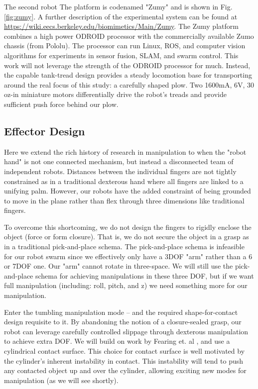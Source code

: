 \documentclass[runningheads,a4paper]{llncs}
\begin{document}
The second robot The platform is codenamed "Zumy" and is shown in Fig. \ref{fig:zumy}.
A further description of the experimental system can be found at \url{https://wiki.eecs.berkeley.edu/biomimetics/Main/Zumy}.
The Zumy platform combines a high power ODROID processor with the commercially available Zumo chassis (from Pololu).
The processor can run Linux, ROS, and computer vision algorithms for experiments in sensor fusion, SLAM, and swarm control.
This work will not leverage the strength of the ODROID processor for much.
Instead, the capable tank-tread design provides a steady locomotion base for transporting around the real focus of this study: a carefully shaped plow.
Two 1600mA, 6V, 30 oz-in miniature motors differentially drive the robot's treads and provide sufficient push force behind our plow.

\subsection{Effector Design}

Here we extend the rich history of research in manipulation to when the "robot hand" is not one connected mechanism, but instead a disconnected team of independent robots.
Distances between the individual fingers are not tightly constrained as in a traditional dexterous hand where all fingers are linked to a unifying palm.
However, our robots have the added constraint of being grounded to move in the plane rather than flex through three dimensions like traditional fingers.

To overcome this shortcoming, we do not design the fingers to rigidly enclose the object (force or form closure).
That is, we do not secure the object in a grasp as in a traditional pick-and-place schema.
The pick-and-place schema is infeasible for our robot swarm since we effectively only have a 3DOF "arm" rather than a 6 or 7DOF one. Our "arm" cannot rotate in three-space.
We will still use the pick-and-place schema for achieving manipulations in these three DOF, but if we want full manipulation (including: roll, pitch, and z) we need something more for our manipulation.

Enter the tumbling manipulation mode -- and the required shape-for-contact design requisite to it.
By abandoning the notion of a closure-sealed grasp, our robot can leverage carefully controlled slippage through dexterous manipulation to achieve extra DOF.
We will build on work by Fearing et. al \cite{fearing1986simplified}, and use a cylindrical contact surface.
This choice for contact surface is well motivated by the cylinder's inherent instability in contact.
This instability will tend to push any contacted object up and over the cylinder, allowing exciting new modes for manipulation (as we will see shortly).
\end{document}
